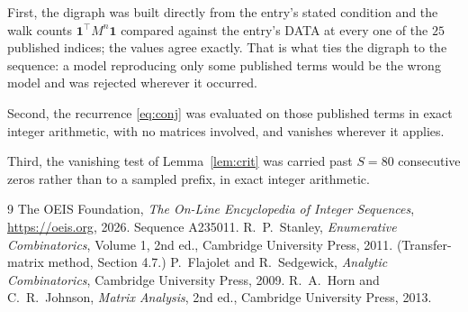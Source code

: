\documentclass[11pt,a4paper]{article}
\theoremstyle{plain}
\theoremstyle{definition}
\begin{document}
First, the digraph was built directly from the entry's stated condition and the walk counts
$\mathbf{1}^{\!\top}M^{n}\mathbf{1}$ compared against the entry's DATA at every one of
the $25$ published indices; the values agree exactly. That is what ties the digraph to
the sequence: a model reproducing only some published terms would be the wrong model and
was rejected wherever it occurred.

Second, the recurrence \eqref{eq:conj} was evaluated on those published terms in exact
integer arithmetic, with no matrices involved, and vanishes wherever it applies.

Third, the vanishing test of Lemma~\ref{lem:crit} was carried past $S=80$ consecutive
zeros rather than to a sampled prefix, in exact integer arithmetic.

\begin{thebibliography}{9}
 The OEIS Foundation, \emph{The On-Line Encyclopedia of Integer
Sequences}, \url{https://oeis.org}, 2026. Sequence A235011.
 R.~P.~Stanley, \emph{Enumerative Combinatorics}, Volume 1, 2nd ed.,
Cambridge University Press, 2011. (Transfer-matrix method, Section 4.7.)
 P.~Flajolet and R.~Sedgewick, \emph{Analytic Combinatorics}, Cambridge
University Press, 2009.
 R.~A.~Horn and C.~R.~Johnson, \emph{Matrix Analysis}, 2nd ed., Cambridge
University Press, 2013.
\end{thebibliography}
\end{document}
